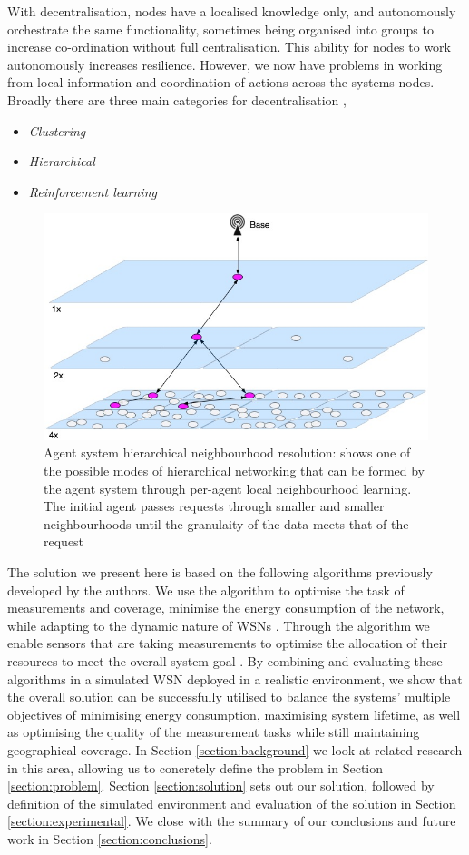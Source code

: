 With decentralisation, nodes have a localised knowledge only, and autonomously orchestrate the same functionality, sometimes being organised into groups to increase co-ordination without full centralisation. This ability for nodes to work autonomously increases resilience. However, we now have problems in working from local information and coordination of actions across the systems nodes. Broadly there are three main categories for decentralisation \citep{10.1007/978-3-642-11814-2_4, 10.1504/IJCNDS.2012.048871},
\begin{itemize}
	\item \textit{Clustering}
	\item \textit{Hierarchical}
	\item \textit{Reinforcement learning}
\end{itemize}
\begin{figure}[]
	\centering
	\includegraphics[width=0.5\linewidth]{WSN_hierarchical_resolution}
	\caption{Agent system hierarchical neighbourhood resolution: shows one of the possible modes of hierarchical networking that can be formed by the agent system through per-agent local neighbourhood learning. The initial agent passes requests through smaller and smaller neighbourhoods until the granulaity of the data meets that of the request}
	\label{fig:wsnhierarchicalresolution}
\end{figure}
The solution we present here is based on the following algorithms previously developed by the authors. We use the \acronymATARIA{}{} algorithm to optimise the task of measurements and coverage, minimise the energy consumption of the network, while adapting to the dynamic nature of WSNs \citep{creech2021dynamic}. Through the \acronymMGRAO{}{} algorithm we enable sensors that are taking measurements to optimise the allocation of their resources to meet the overall system goal \citep{creech2021resource}. By combining and evaluating these algorithms in a simulated WSN deployed in a realistic environment, we show that the overall solution can be successfully utilised to balance the systems' multiple objectives of minimising energy consumption, maximising system lifetime, as well as optimising the quality of the measurement tasks while still maintaining geographical coverage.
In Section \ref{section:background} we look at related research in this area, allowing us to concretely define the problem in Section \ref{section:problem}. Section \ref{section:solution} sets out our solution, followed by definition of the simulated environment and evaluation of the solution in Section \ref{section:experimental}. We close with the summary of our conclusions and future work in Section \ref{section:conclusions}.


